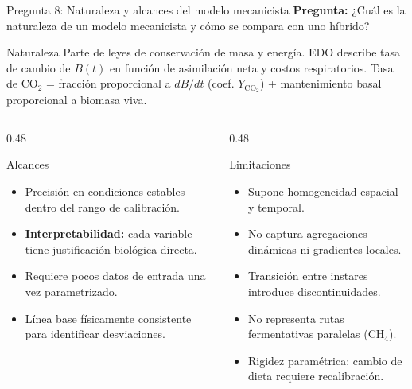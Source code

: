 \documentclass[aspectratio=169, 11pt]{beamer}
\begin{document}
\begin{frame}{Pregunta 8: Naturaleza y alcances del modelo mecanicista}
\textbf{Pregunta:} ¿Cuál es la naturaleza de un modelo mecanicista y cómo se compara con uno híbrido?

\vspace{0.3cm}
\begin{block}{Naturaleza}
\footnotesize
Parte de leyes de conservación de masa y energía. EDO describe tasa de cambio de $B(t)$ en función de asimilación neta y costos respiratorios. Tasa de CO$_2$ = fracción proporcional a $dB/dt$ (coef. $Y_{\text{CO}_2}$) + mantenimiento basal proporcional a biomasa viva.
\end{block}
\begin{columns}[T]
\begin{column}{0.48\textwidth}
\begin{exampleblock}{Alcances}
\footnotesize
\begin{itemize}
    \item Precisión en condiciones estables dentro del rango de calibración.
    \item \textbf{Interpretabilidad:} cada variable tiene justificación biológica directa.
    \item Requiere pocos datos de entrada una vez parametrizado.
    \item Línea base físicamente consistente para identificar desviaciones.
\end{itemize}
\end{exampleblock}
\end{column}
\begin{column}{0.48\textwidth}
\begin{alertblock}{Limitaciones}
\footnotesize
\begin{itemize}
    \item Supone homogeneidad espacial y temporal.
    \item No captura agregaciones dinámicas ni gradientes locales.
    \item Transición entre instares introduce discontinuidades.
    \item No representa rutas fermentativas paralelas (CH$_4$).
    \item Rigidez paramétrica: cambio de dieta requiere recalibración.
\end{itemize}
\end{alertblock}
\end{column}
\end{columns}
\end{frame}
\end{document}

